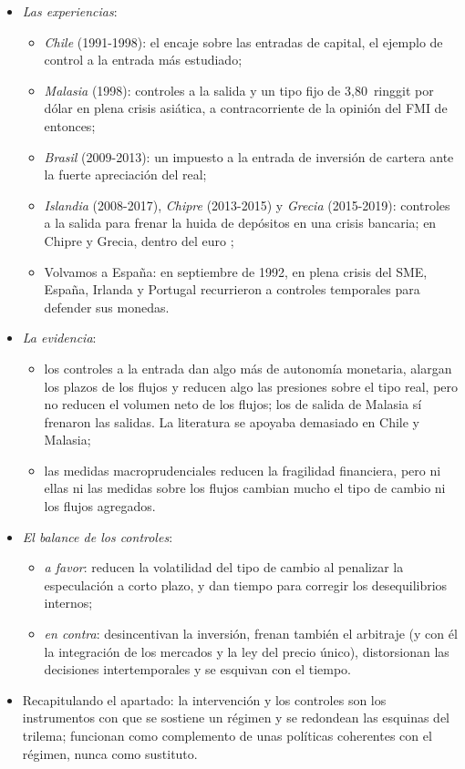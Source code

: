 \documentclass[11pt]{article}
\begin{document}
\begin{itemize}
\item \emph{Las experiencias}:
  \begin{itemize}
  \item \emph{Chile} (1991-1998): el encaje sobre las entradas de capital, el ejemplo de control a la entrada más estudiado;
  \item \emph{Malasia} (1998): controles a la salida y un tipo fijo de 3,80~ringgit por dólar en plena crisis asiática, a contracorriente de la opinión del FMI de entonces\nocite{Singh2023Malaysia};
  \item \emph{Brasil} (2009-2013): un impuesto a la entrada de inversión de cartera ante la fuerte apreciación del real\nocite{ForbesFratzscherStraub2015Capital};
  \item \emph{Islandia} (2008-2017), \emph{Chipre} (2013-2015) y \emph{Grecia} (2015-2019): controles a la salida para frenar la huida de depósitos en una crisis bancaria; en Chipre y Grecia, dentro del euro\nocite{FMI2022RevisionVI} ;
  \item Volvamos a España: en septiembre de 1992, en plena crisis del SME, España, Irlanda y Portugal recurrieron a controles temporales para defender sus monedas\nocite{EichengreenWyplosz1993Unstable}.
  \end{itemize}
\item \emph{La evidencia}:
  \begin{itemize}
  \item los controles a la entrada dan algo más de autonomía monetaria, alargan los plazos de los flujos y reducen algo las presiones sobre el tipo real, pero no reducen el volumen neto de los flujos; los de salida de Malasia sí frenaron las salidas. La literatura se apoyaba demasiado en Chile y Malasia\nocite{MagudReinhartRogoff2018Capital};
  \item las medidas macroprudenciales reducen la fragilidad financiera, pero ni ellas ni las medidas sobre los flujos cambian mucho el tipo de cambio ni los flujos agregados\nocite{ForbesFratzscherStraub2015Capital}.
  \end{itemize}
\item \emph{El balance de los controles}:
  \begin{itemize}
  \item \emph{a favor}: reducen la volatilidad del tipo de cambio al penalizar la especulación a corto plazo, y dan tiempo para corregir los desequilibrios internos;
  \item \emph{en contra}: desincentivan la inversión, frenan también el arbitraje (y con él la integración de los mercados y la ley del precio único), distorsionan las decisiones intertemporales y se esquivan con el tiempo.
  \end{itemize}
\item Recapitulando el apartado: la intervención y los controles son los instrumentos con que se sostiene un régimen y se redondean las esquinas del trilema; funcionan como complemento de unas políticas coherentes con el régimen, nunca como sustituto.
\end{itemize}
\end{document}
